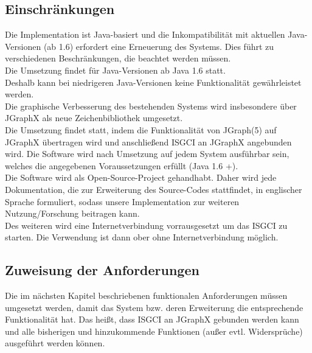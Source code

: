 \documentclass[10pt,a4paper]{article}
\begin{document}
	\subsection{Einschränkungen} %
	Die Implementation ist Java-basiert und die Inkompatibilität mit aktuellen Java-Versionen (ab 1.6) erfordert eine Erneuerung des Systems. Dies führt zu verschiedenen Beschränkungen, die beachtet werden müssen.\\
	Die Umsetzung findet für Java-Versionen ab Java 1.6 statt. \\
	Deshalb kann bei niedrigeren Java-Versionen keine Funktionalität gewährleistet werden.\\
	Die graphische Verbesserung des bestehenden Systems wird insbesondere über JGraphX als neue Zeichenbibliothek umgesetzt.\\
	Die Umsetzung findet statt, indem die Funktionalität von JGraph(5) auf JGraphX übertragen wird und anschließend ISGCI an JGraphX angebunden wird.  %
	Die Software wird nach Umsetzung auf jedem System ausführbar sein, welches die angegebenen Voraussetzungen erfüllt (Java 1.6 +).\\
	Die Software wird als Open-Source-Project %
gehandhabt. Daher wird jede Dokumentation, die zur Erweiterung des Source-Codes stattfindet, in englischer Sprache formuliert, sodass unsere Implementation zur weiteren Nutzung/Forschung beitragen kann. \\
	Des weiteren wird eine Internetverbindung vorrausgesetzt um das ISGCI zu starten. Die Verwendung ist dann ober ohne Internetverbindung möglich.
	\subsection{Zuweisung der Anforderungen} %
	Die im nächsten Kapitel beschriebenen funktionalen Anforderungen müssen umgesetzt werden, damit das System bzw. deren Erweiterung die entsprechende Funktionalität hat. Das heißt, dass ISGCI an JGraphX gebunden werden kann und alle bisherigen und hinzukommende Funktionen (außer evtl. Widersprüche) ausgeführt werden können.
\newpage
\end{document}
